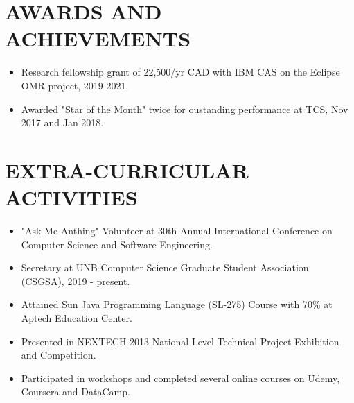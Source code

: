 \documentclass[10pt,a4paper,roman]{moderncv}        %
\begin{document}
{{%

\section{AWARDS AND ACHIEVEMENTS}
\begin{minipage}{\maincolumnwidth}%
	\small{
    	\begin{itemize}
          \item Research fellowship grant of 22,500/yr CAD with IBM CAS on the Eclipse OMR project, 2019-2021. 
          \item Awarded "Star of the Month" twice for oustanding performance at TCS, Nov 2017 and Jan 2018.
		\end{itemize}}%
\end{minipage}%

\section{EXTRA-CURRICULAR ACTIVITIES}
\begin{minipage}{\maincolumnwidth}%
	\small{
    	\begin{itemize}
          \item "Ask Me Anthing" Volunteer at 30th Annual International Conference on Computer Science and Software Engineering. 
          \item Secretary at UNB Computer Science Graduate Student Association (CSGSA), 2019 - present. 
          \item Attained Sun Java Programming Language (SL-275) Course with 70\% at Aptech Education Center.
          \item Presented in NEXTECH-2013 National Level Technical Project Exhibition and Competition.
          \item Participated in workshops and completed several online courses on Udemy, Coursera and DataCamp. 
		\end{itemize}}%
\end{minipage}%


}}
\end{document}
